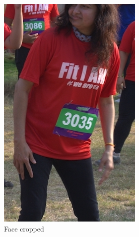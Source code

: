 \begin{figure}[p]
\begin{subfigure}[b]{0.25\textwidth}
    \includegraphics[width=\textwidth]{images/dataset/Prominence_FaceNotVisible_Cropped}
      \caption{Face cropped}
  \end{subfigure}
  \hspace{\fill}
  \begin{subfigure}[b]{0.25\textwidth}

\end{subfigure}
\end{figure}
